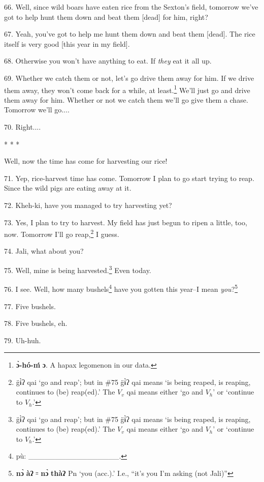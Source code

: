 \setcounter{footnote}{0}


66. Well, since wild boars have eaten rice from the Sexton's field, tomorrow we've
got to help hunt them down and beat them [dead] for him, right?

67. Yeah, you've got to help me hunt them down and beat them [dead]. The rice itself
is very good [this year in my field].

68. Otherwise you won't have anything to eat. If \textit{they} eat it all up.

69. Whether we catch them or not, let's go drive them away for him. If we drive
them away, they won't come back for a while, at least.\footnote{\textbf{ɔ̀-hó-ḿ} \textbf{ɔ}. A hapax legomenon in our data.} We'll just go and drive
them away for him. Whether or not we catch them we'll go give them a chase. Tomorrow
we'll go....

70. Right....

\begin{center}
* * *
\end{center}

Well, now the time has come for harvesting our rice!

71. Yep, rice-harvest time has come. Tomorrow I plan to go start trying to reap.
Since the wild pigs are eating away at it.

72. Kheh-ki, have you managed to try harvesting yet?

73. Yes, I plan to try to harvest. My field has just begun to ripen a little, too,
now. Tomorrow I'll go reap,\footnote{g̈ɨ̀ʔ qai `go and reap'; but in \#75 g̈ɨ̀ʔ qai means `is being reaped, is reaping, continues to (be) reap(ed).' The $V_v$ qai means either `go and $V_h$' or `continue to $V_h$.'} I guess.

74. Jali, what about you?

75. Well, mine is being harvested.\footnote{g̈ɨ̀ʔ qai `go and reap'; but in \#75 g̈ɨ̀ʔ qai means `is being reaped, is reaping, continues to (be) reap(ed).' The $V_v$ qai means either `go and $V_h$' or `continue to $V_h$.'} Even today.

76. I see. Well, how many bushels\footnote{pù: \_\_\_\_\_\_\_\_\_\_\_\_\_\_\_\_\_.} have you gotten this year--I mean \emph{you}?\footnote{\textbf{nɔ̀} \textbf{àʔ} ꞊ \textbf{nɔ̀} \textbf{thàʔ} Pn `you (acc.).' I.e., ``it's you I'm asking (not Jali)''}

77. Five bushels.

78. Five bushels, eh.

79. Uh-huh.

